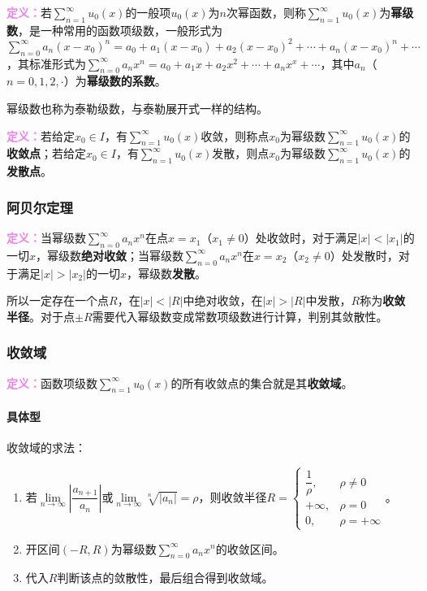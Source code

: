 \documentclass[UTF8, 12pt]{ctexart}
\begin{document}
\textcolor{violet}{\textbf{定义：}}若$\sum\limits_{n=1}^\infty u_0(x)$的一般项$u_0(x)$为$n$次幂函数，则称$\sum\limits_{n=1}^\infty u_0(x)$为\textbf{幂级数}，是一种常用的函数项级数，一般形式为$\sum\limits_{n=0}^\infty a_n(x-x_0)^n=a_0+a_1(x-x_0)+a_2(x-x_0)^2+\cdots+a_n(x-x_0)^n+\cdots$，其标准形式为$\sum\limits_{n=0}^\infty a_nx^n=a_0+a_1x+a_2x^2+\cdots+a_nx^x+\cdots$，其中$a_n$（$n=0,1,2,\cdot$）为\textbf{幂级数的系数}。

幂级数也称为泰勒级数，与泰勒展开式一样的结构。

\textcolor{violet}{\textbf{定义：}}若给定$x_0\in I$，有$\sum\limits_{n=1}^\infty u_0(x)$收敛，则称点$x_0$为幂级数$\sum\limits_{n=1}^\infty u_0(x)$的\textbf{收敛点}；若给定$x_0\in I$，有$\sum\limits_{n=1}^\infty u_0(x)$发散，则点$x_0$为幂级数$\sum\limits_{n=1}^\infty u_0(x)$的\textbf{发散点}。

\subsubsection{阿贝尔定理}

\textcolor{violet}{\textbf{定义：}}当幂级数$\sum\limits_{n=0}^\infty a_nx^n$在点$x=x_1$（$x_1\neq0$）处收敛时，对于满足$\vert x\vert<\vert x_1\vert$的一切$x$，幂级数\textbf{绝对收敛}；当幂级数$\sum\limits_{n=0}^\infty a_nx^n$在$x=x_2$（$x_2\neq0$）处发散时，对于满足$\vert x\vert>\vert x_2\vert$的一切$x$，幂级数\textbf{发散}。

所以一定存在一个点$R$，在$\vert x\vert<\vert R\vert$中绝对收敛，在$\vert x\vert>\vert R\vert$中发散，$R$称为\textbf{收敛半径}。对于点$\pm R$需要代入幂级数变成常数项级数进行计算，判别其敛散性。

\subsubsection{收敛域}

\textcolor{violet}{\textbf{定义：}}函数项级数$\sum\limits_{n=1}^\infty u_0(x)$的所有收敛点的集合就是其\textbf{收敛域}。

\paragraph{具体型} \leavevmode \medskip

收敛域的求法：

\begin{enumerate}
    \item 若$\lim\limits_{n\to\infty}\left\vert\dfrac{a_{n+1}}{a_n}\right\vert$或$\lim\limits_{n\to\infty}\sqrt[n]{\vert a_n\vert}=\rho$，则收敛半径$R=\left\{\begin{array}{ll}
        \dfrac{1}{\rho}, & \rho\neq0 \\
        +\infty, & \rho=0 \\
        0, & \rho=+\infty
    \end{array}\right.$。
    \item 开区间$(-R,R)$为幂级数$\sum\limits_{n=0}^\infty a_nx^n$的收敛区间。
    \item 代入$R$判断该点的敛散性，最后组合得到收敛域。
\end{enumerate}
\end{document}
